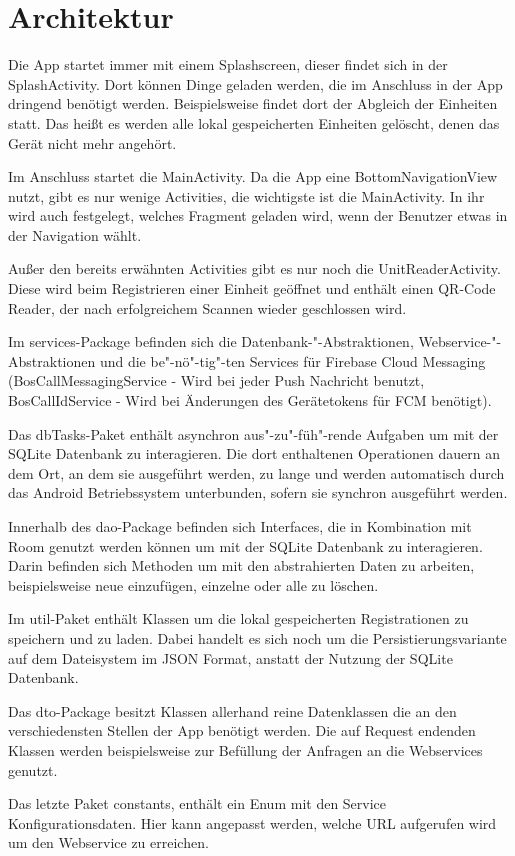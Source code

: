 \section{Architektur}
Die App startet immer mit einem Splashscreen, dieser findet sich in der SplashActivity. Dort können Dinge geladen werden, die im Anschluss in der App dringend benötigt werden. Beispielsweise findet dort der Abgleich der Einheiten statt. Das heißt es werden alle lokal gespeicherten Einheiten gelöscht, denen das Gerät nicht mehr angehört.

Im Anschluss startet die MainActivity. Da die App eine BottomNavigationView nutzt, gibt es nur wenige Activities, die wichtigste ist die MainActivity. In ihr wird auch festgelegt, welches Fragment geladen wird, wenn der Benutzer etwas in der Navigation wählt. 

Außer den bereits erwähnten Activities gibt es nur noch die UnitReaderActivity. Diese wird beim Registrieren einer Einheit geöffnet und enthält einen QR-Code Reader, der nach erfolgreichem Scannen wieder geschlossen wird.

Im services-Package befinden sich die Datenbank-"-Abstraktionen, Webservice-"-Abstraktionen und die be"-nö"-tig"-ten Services für Firebase Cloud Messaging (BosCallMessagingService - Wird bei jeder Push Nachricht benutzt, BosCallIdService - Wird bei Änderungen des Gerätetokens für FCM benötigt).

Das dbTasks-Paket enthält asynchron aus"-zu"-füh"-rende Aufgaben um mit der SQLite Datenbank zu interagieren. Die dort enthaltenen Operationen dauern an dem Ort, an dem sie ausgeführt werden, zu lange und werden automatisch durch das Android Betriebssystem unterbunden, sofern sie synchron ausgeführt werden.

Innerhalb des dao-Package befinden sich Interfaces, die in Kombination mit Room genutzt werden können um mit der SQLite Datenbank zu interagieren. Darin befinden sich Methoden um mit den abstrahierten Daten zu arbeiten, beispielsweise neue einzufügen, einzelne oder alle zu löschen.

Im util-Paket enthält Klassen um die lokal gespeicherten Registrationen zu speichern und zu laden. Dabei handelt es sich noch um die Persistierungsvariante auf dem Dateisystem im JSON Format, anstatt der Nutzung der SQLite Datenbank.

Das dto-Package besitzt Klassen allerhand reine Datenklassen die an den verschiedensten Stellen der App benötigt werden. Die auf Request endenden Klassen werden beispielsweise zur Befüllung der Anfragen an die Webservices genutzt.

Das letzte Paket constants, enthält ein Enum mit den Service Konfigurationsdaten. Hier kann angepasst werden, welche URL aufgerufen wird um den Webservice zu erreichen.